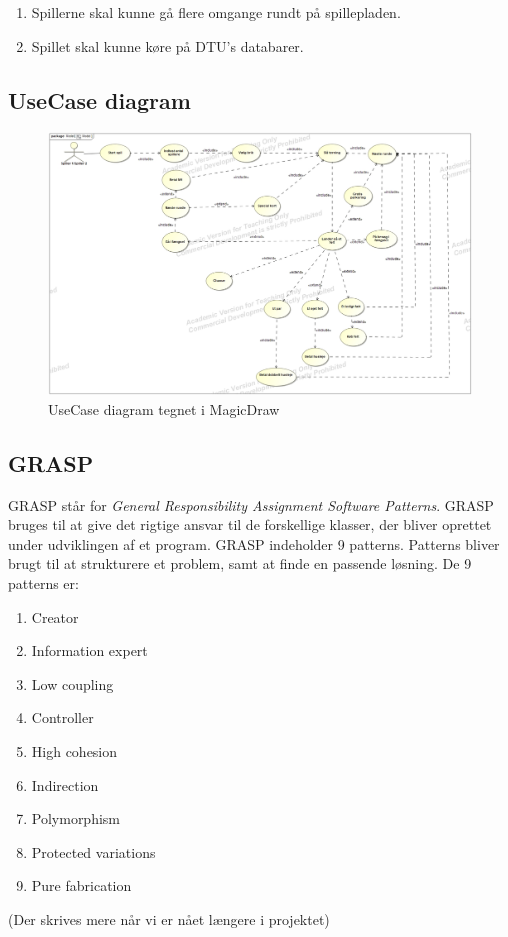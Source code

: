 \begin{enumerate}
            \item Spillerne skal kunne gå flere omgange rundt på spillepladen.
            \item Spillet skal kunne køre på DTU’s databarer.

        \end{enumerate}



\pagebreak
\subsection{UseCase diagram}
    \begin{figure}[h]
        \advance\leftskip-3cm
        \includegraphics[width=20cm]{fig/UC-cdio3.jpg}
        \caption{UseCase diagram tegnet i MagicDraw}
    \end{figure}

\subsection{GRASP}
    GRASP står for \textit{General Responsibility Assignment Software Patterns}. GRASP bruges til at give det rigtige ansvar til de forskellige klasser, der bliver oprettet under udviklingen af et program. GRASP indeholder 9 patterns. Patterns bliver brugt til at strukturere et problem, samt at finde en passende løsning. De 9 patterns er:
        \begin{enumerate}
            \item Creator
            \item Information expert
            \item Low coupling
            \item Controller
            \item High cohesion
            \item Indirection
            \item Polymorphism
            \item Protected variations
            \item Pure fabrication
        \end{enumerate}
    (Der skrives mere når vi er nået længere i projektet)
